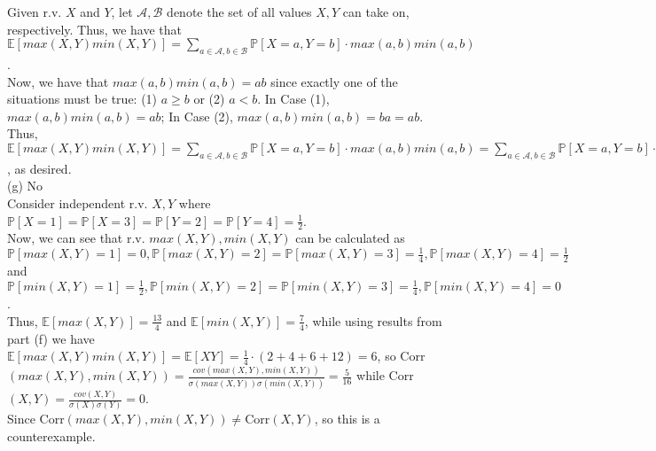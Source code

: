 \documentclass{article}
\begin{document}
Given r.v. $X$ and $Y$, let $\mathscr{A}, \mathscr{B}$ denote the set of all values $X,Y$ can take on, respectively. Thus, we have that
$\mathbb{E}[max(X,Y)min(X,Y)] =
\sum\limits_{a\in\mathscr{A}, b\in\mathscr{B}} \mathbb{P}[X=a,Y=b]\cdot max(a,b)min(a,b)$. \\

Now, we have that $max(a,b)min(a,b) = ab$ since exactly one of the situations must be true: (1) $a\geq b$ or (2) $a<b$. In Case (1), $max(a,b)min(a,b) = ab$; In Case (2), $max(a,b)min(a,b) = ba = ab$. \\

Thus, $\mathbb{E}[max(X,Y)min(X,Y)] =
\sum\limits_{a\in\mathscr{A}, b\in\mathscr{B}} \mathbb{P}[X=a,Y=b]\cdot max(a,b)min(a,b) =
\sum\limits_{a\in\mathscr{A}, b\in\mathscr{B}} \mathbb{P}[X=a,Y=b]\cdot ab = \mathbb{E}[XY]$, as desired. \\[.5cm]
{\color{red} (g) No } \\

Consider independent r.v. $X, Y$ where $\mathbb{P}[X=1]=\mathbb{P}[X=3] = \mathbb{P}[Y=2] = \mathbb{P}[Y=4] = \frac{1}{2}$. \\

Now, we can see that r.v. $max(X,Y), min(X,Y)$ can be calculated as $\mathbb{P}[max(X,Y)=1] = 0, \mathbb{P}[max(X,Y)=2] = \mathbb{P}[max(X,Y)=3] = \frac{1}{4}, \mathbb{P}[max(X,Y)=4] = \frac{1}{2}$ and
$\mathbb{P}[min(X,Y)=1] = \frac{1}{2}, \mathbb{P}[min(X,Y)=2] = \mathbb{P}[min(X,Y)=3] = \frac{1}{4}, \mathbb{P}[min(X,Y)=4] = 0$.\\

Thus, $\mathbb{E}[max(X,Y)] = \frac{13}{4}$ and $\mathbb{E}[min(X,Y)] = \frac{7}{4}$, while using results from part (f) we have $\mathbb{E}[max(X,Y)min(X,Y)] = \mathbb{E}[XY] = \frac{1}{4}\cdot(2+4+6+12) = 6$, so Corr$(max(X,Y), min(X,Y)) = \frac{cov(max(X,Y), min(X,Y))}{\sigma(max(X,Y))\sigma(min(X,Y))} = \frac{5}{16}$ while Corr$(X,Y) = \frac{cov(X,Y)}{\sigma(X)\sigma(Y)} = 0$. \\

Since Corr$(max(X,Y), min(X,Y))\neq$Corr$(X,Y)$, so this is a counterexample.
\end{document}
